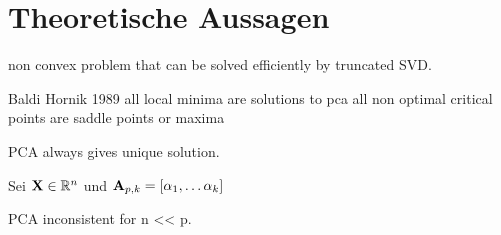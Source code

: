 \section{Theoretische Aussagen}

non convex problem that can be solved efficiently by truncated SVD.

Baldi Hornik 1989
all local minima are solutions to pca
all non optimal critical points are saddle points or maxima

\begin{thm}
PCA always gives unique solution.
\end{thm}

\begin{thm}
Sei $\mathbf{X} \in \mathbb{R}^n$ und $\mathbf{A}_{p,k} = [\alpha_1, \ldots \alpha_k] $   
\end{thm}

\begin{thm}
PCA inconsistent for n << p.
\end{thm}

